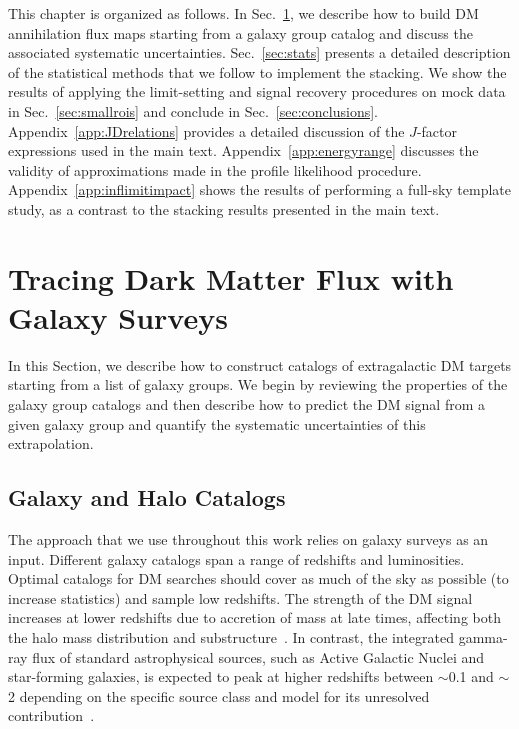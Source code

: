 This chapter is organized as follows. In Sec.~\ref{sec:galaxyfilteringpipeline}, we describe how to build DM annihilation flux maps starting from a galaxy group catalog and discuss the associated systematic uncertainties.  Sec.~\ref{sec:stats} presents a detailed description of the statistical methods that we follow to implement the stacking. We show the results of applying the limit-setting and signal recovery procedures on mock data in Sec.~\ref{sec:smallrois} and conclude in Sec.~\ref{sec:conclusions}.  Appendix~\ref{app:JDrelations} provides a  detailed discussion of the $J$-factor expressions used in the main text.  Appendix~\ref{app:energyrange} discusses the validity of approximations made in the profile likelihood procedure.   Appendix~\ref{app:inflimitimpact} shows the results of performing a full-sky template study, as a contrast to the stacking results presented in the main text.

\section{Tracing Dark Matter Flux with Galaxy Surveys}
\label{sec:galaxyfilteringpipeline}

In this Section, we describe how to construct catalogs of extragalactic DM targets starting from a list of galaxy groups.  We begin by reviewing the properties of the galaxy group catalogs and then describe how to predict the DM signal from a given galaxy group and quantify the systematic uncertainties of this extrapolation.  

\subsection{Galaxy and Halo Catalogs}

The approach that we use throughout this work relies on galaxy surveys as an input.  Different galaxy catalogs span a range of redshifts and luminosities. Optimal catalogs for DM searches should cover as much of the sky as possible (to increase statistics) and sample low redshifts.  The strength of the DM signal increases at lower redshifts due to accretion of mass at late times, affecting both the halo mass distribution and substructure~\cite{Ando:2014aoa}.  In contrast, the integrated gamma-ray flux of standard astrophysical sources, such as Active Galactic Nuclei and star-forming galaxies, is expected to peak at higher redshifts between $\sim$0.1 and $\sim$2 depending on the specific source class and model for its unresolved contribution~\cite{Ando:2014aoa, Xia:2015wka}.  


